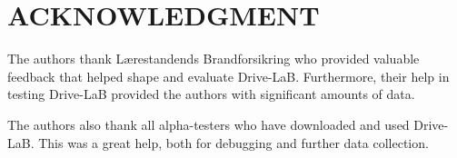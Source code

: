 \section*{ACKNOWLEDGMENT}

The authors thank Lærestandends Brandforsikring who provided valuable feedback that helped shape and evaluate Drive-LaB. Furthermore, their help in testing Drive-LaB provided the authors with significant amounts of data.

The authors also thank all alpha-testers who have downloaded and used Drive-LaB. This was a great help, both for debugging and further data collection.